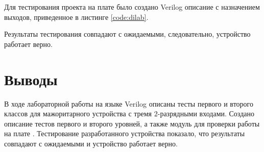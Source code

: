 Для тестирования проекта на плате было создано Verilog описание с назначением выходов, приведенное в листинге \ref{code:dilab}.


Результаты тестирования совпадают с ожидаемыми, следовательно, устройство работает верно.

\section{Выводы}

В ходе лабораторной работы на языке Verilog описаны тесты первого и второго классов для мажоритарного устройства с тремя $2$-разрядными входами. Создано описание тестов первого и второго уровней, а также модуль для проверки работы на плате . Тестирование разработанного устройства показало, что результаты совпадают с ожидаемыми и устройство работает верно.


